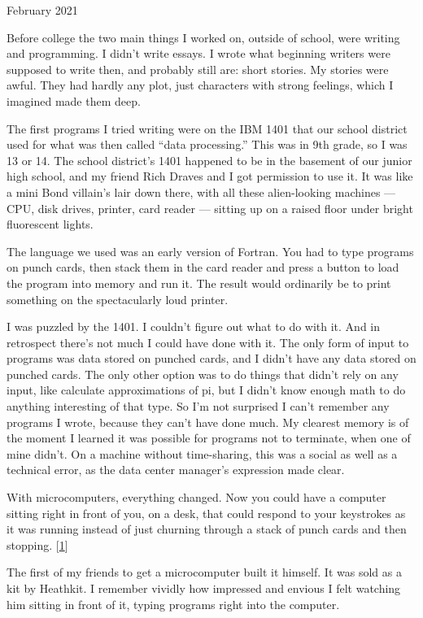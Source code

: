 February 2021

Before college the two main things I worked on, outside of school, were
writing and programming. I didn't write essays. I wrote what beginning
writers were supposed to write then, and probably still are: short
stories. My stories were awful. They had hardly any plot, just
characters with strong feelings, which I imagined made them deep.

The first programs I tried writing were on the IBM 1401 that our school
district used for what was then called ``data processing.'' This was in
9th grade, so I was 13 or 14. The school district's 1401 happened to be
in the basement of our junior high school, and my friend Rich Draves and
I got permission to use it. It was like a mini Bond villain's lair down
there, with all these alien-looking machines --- CPU, disk drives,
printer, card reader --- sitting up on a raised floor under bright
fluorescent lights.

The language we used was an early version of Fortran. You had to type
programs on punch cards, then stack them in the card reader and press a
button to load the program into memory and run it. The result would
ordinarily be to print something on the spectacularly loud printer.

I was puzzled by the 1401. I couldn't figure out what to do with it. And
in retrospect there's not much I could have done with it. The only form
of input to programs was data stored on punched cards, and I didn't have
any data stored on punched cards. The only other option was to do things
that didn't rely on any input, like calculate approximations of pi, but
I didn't know enough math to do anything interesting of that type. So
I'm not surprised I can't remember any programs I wrote, because they
can't have done much. My clearest memory is of the moment I learned it
was possible for programs not to terminate, when one of mine didn't. On
a machine without time-sharing, this was a social as well as a technical
error, as the data center manager's expression made clear.

With microcomputers, everything changed. Now you could have a computer
sitting right in front of you, on a desk, that could respond to your
keystrokes as it was running instead of just churning through a stack of
punch cards and then stopping. {[}\hyperref[f1n]{1}{]}

The first of my friends to get a microcomputer built it himself. It was
sold as a kit by Heathkit. I remember vividly how impressed and envious
I felt watching him sitting in front of it, typing programs right into
the computer.

